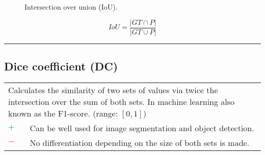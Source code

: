 \documentclass{article}
\begin{document}
\begin{figure}[H]
	\centering


	\caption{Intersection over union (IoU).}
	\label{figure:IoU}
\end{figure}

\begin{equation}
	\textit{IoU} = \dfrac{|\textit{GT} \cap P|}{|\textit{GT} \cup P|}
%
	\label{equation:IoU}
\end{equation}

\hrule


\subsection[Dice coefficient (DC)]{Dice coefficient (DC) \cite{dice1945measures, sorenson1948method}}

\begin{table}[H]\centering
	\begin{tabular}{m{}m{}}
		\multicolumn{2}{m{0.95\textwidth}}{Calculates the similarity of two sets of values via twice the intersection over the sum of both sets. In machine learning also known as the F1-score. (range: $[0, 1]$)} \\
		\textcolor{Green}{$+$} & Can be well used for image segmentation and object detection. \\
		\textcolor{Red}{$-$}   & No differentiation depending on the size of both sets is made.
	\end{tabular}
\end{table}
\end{document}
